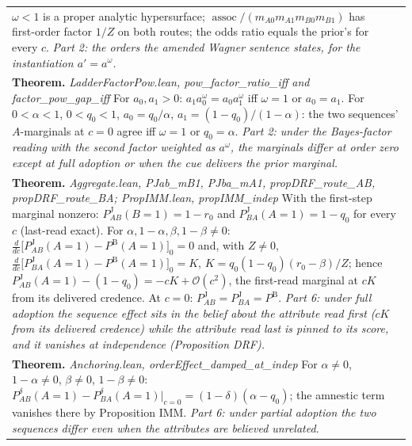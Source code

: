 \documentclass[10pt]{article}
\theoremstyle{definition}
\newcommand{\PB}{P^{\mathrm{B}}}
\newcommand{\PJ}{P^{\mathrm{J}}}
\newcommand{\assoc}{\operatorname{assoc}}
\newcommand{\bigO}{\mathcal{O}}
\newlength{\fullw}\setlength{\fullw}{25.9cm}
\begin{document}
{\begin{longtable}{|p{0.9cm}|p{12.2cm}|p{12.2cm}|}
{$\omega<1$ is a proper analytic hypersurface; $\assoc/(m_{A0}m_{A1}m_{B0}m_{B1})$ has first-order
factor $1/Z$ on both routes; the odds ratio equals the prior's for every $c$. \newline \textit{Part 2: the orders the amended Wagner sentence states, for the instantiation $a'=a^{\omega}$.}} \\
\multicolumn{3}{|p{\fullw}|}{\textbf{Theorem.} \textit{LadderFactorPow.lean, pow\_factor\_ratio\_iff and factor\_pow\_gap\_iff} \newline For $a_0,a_1>0$: $a_1a_0^{\omega}=a_0a_1^{\omega}$ iff $\omega=1$ or $a_0=a_1$. For
$0<\alpha<1$, $0<q_0<1$, $a_0=q_0/\alpha$, $a_1=(1-q_0)/(1-\alpha)$: the two sequences'
$A$-marginals at $c=0$ agree iff $\omega=1$ or $q_0=\alpha$. \newline \textit{Part 2: under the Bayes-factor reading with the second factor weighted as $a^{\omega}$, the marginals differ at order zero except at full adoption or when the cue delivers the prior marginal.}} \\
\multicolumn{3}{|p{\fullw}|}{\textbf{Theorem.} \textit{Aggregate.lean, PJab\_mB1, PJba\_mA1, propDRF\_route\_AB, propDRF\_route\_BA; PropIMM.lean, propIMM\_indep} \newline With the first-step marginal nonzero: $\PJ_{AB}(B{=}1)=1-r_0$ and
$\PJ_{BA}(A{=}1)=1-q_0$ for every $c$ (last-read exact). For
$\alpha,1-\alpha,\beta,1-\beta\neq0$:
$\frac{d}{dc}\bigl[\PJ_{AB}(A{=}1)-\PB(A{=}1)\bigr]_{0}=0$ and, with $Z\neq0$,
$\frac{d}{dc}\bigl[\PJ_{BA}(A{=}1)-\PB(A{=}1)\bigr]_{0}=K$, $K=q_0(1-q_0)(r_0-\beta)/Z$;
hence $\PJ_{AB}(A{=}1)-(1-q_0)=-cK+\bigO(c^2)$, the first-read marginal at $cK$ from
its delivered credence. At $c=0$: $\PJ_{AB}=\PJ_{BA}=\PB$. \newline \textit{Part 6: under full adoption the sequence effect sits in the belief about the attribute read first ($cK$ from its delivered credence) while the attribute read last is pinned to its score, and it vanishes at independence (Proposition DRF).}} \\
\multicolumn{3}{|p{\fullw}|}{\textbf{Theorem.} \textit{Anchoring.lean, orderEffect\_damped\_at\_indep} \newline For $\alpha\neq0$, $1-\alpha\neq0$, $\beta\neq0$, $1-\beta\neq0$:
$P^{\delta}_{AB}(A{=}1)-P^{\delta}_{BA}(A{=}1)\big|_{c=0}=(1-\delta)(\alpha-q_0)$; the
amnestic term vanishes there by Proposition IMM. \newline \textit{Part 6: under partial adoption the two sequences differ even when the attributes are believed unrelated.}} \\ \hline

\end{longtable}}
\end{document}
